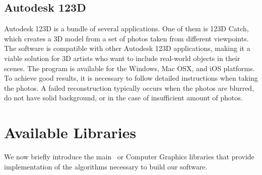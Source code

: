 
\subsection{Autodesk 123D}

Autodesk 123D is a bundle of several applications. 
One of them is 123D Catch, which creates a 3D model from a set of photos taken from different viewpoints.
The software is compatible with other Autodesk 123D applications, making it a viable solution for 3D artists who want to include real-world objects in their scenes.
The program is available for the Windows, Mac OSX, and iOS platforms.
To achieve good results, it is necessary to follow detailed instructions when taking the photos. 
A failed reconstruction typically occurs when the photos are blurred, do not have solid background, or in the case of insufficient amount of photos. %


\section{Available Libraries}
\label{lib} 

We now briefly introduce the main \cv\ or Computer Graphics libraries that provide implementation of the algorithms necessary to build our software. %

